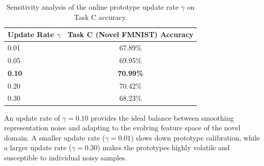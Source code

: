 \documentclass{article}
\theoremstyle{plain}
\theoremstyle{definition}
\theoremstyle{remark}
\begin{document}
\begin{table}[ht]
\caption{Sensitivity analysis of the online prototype update rate $\gamma$ on Task C accuracy.}
\label{table:gamma_sensitivity}
\vskip 0.15in
\begin{center}
\begin{small}
\begin{sc}
\begin{tabular}{lc}
\toprule
Update Rate $\gamma$ & Task C (Novel FMNIST) Accuracy \\
\midrule
0.01 & 67.89\% \\
0.05 & 69.95\% \\
\textbf{0.10} & \textbf{70.99\%} \\
0.20 & 70.42\% \\
0.30 & 68.23\% \\
\bottomrule
\end{tabular}
\end{sc}
\end{small}
\end{center}
\vskip -0.1in
\end{table}

An update rate of $\gamma = 0.10$ provides the ideal balance between smoothing representation noise and adapting to the evolving feature space of the novel domain. A smaller update rate ($\gamma = 0.01$) slows down prototype calibration, while a larger update rate ($\gamma = 0.30$) makes the prototypes highly volatile and susceptible to individual noisy samples.
\end{document}
